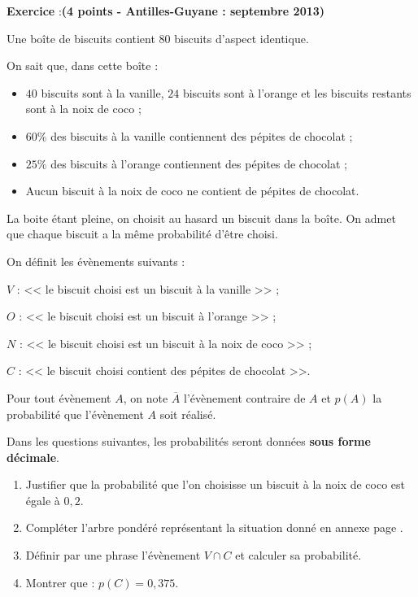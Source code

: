 \documentclass[11pt,french]{article}
\newcounter{exoc}
\newenvironment{exoc}[1]{%
  \refstepcounter{exoc}\textbf{Exercice \theexoc} :\hfill {\footnotesize\textbf{(#1)}}\par
  \medskip}%
{\medskip}
\begin{document}

\begin{exoc}{4 points - Antilles-Guyane : septembre 2013}\label{proba}
    Une boîte de biscuits contient $80$ biscuits d’aspect identique.\par
    On sait que, dans cette boîte :
        \begin{itemize}[label=\textbullet\quad]
            \item $40$ biscuits sont à la vanille, $24$ biscuits sont à l’orange et les biscuits restants sont à la noix de coco ;
            \item $60\%$ des biscuits à la vanille contiennent des pépites de chocolat ;
            \item $25\%$ des biscuits à l’orange contiennent des pépites de chocolat ;
            \item Aucun biscuit à la noix de coco ne contient de pépites de chocolat.
        \end{itemize}
    La boite étant pleine, on choisit au hasard un biscuit dans la boîte. On admet que chaque biscuit a la même probabilité d’être choisi.\par\smallskip
    On définit les évènements suivants :\par
    $V$ : << le biscuit choisi est un biscuit à la vanille >> ;\par
    $O$ : << le biscuit choisi est un biscuit à l’orange >> ;\par
    $N$ : << le biscuit choisi est un biscuit à la noix de coco >> ;\par
    $C$ : << le biscuit choisi contient des pépites de chocolat >>.\par\smallskip
    Pour tout évènement $A$, on note $\overline A$ l’évènement contraire de $A$ et $p(A)$ la probabilité que l’évènement $A$ soit réalisé.\par
    Dans les questions suivantes, les probabilités seront données \textbf{sous forme décimale}.\medskip

    \begin{enumerate}
        \item Justifier que la probabilité que l’on choisisse un biscuit à la noix de coco est égale à $0,2$.
        \item Compléter l’arbre pondéré représentant la situation donné en annexe page \pageref{Annexe}.
        \item Définir par une phrase l’évènement $V \cap C$ et calculer sa probabilité.
        \item Montrer que : $p(C)= 0,375$.
    \end{enumerate}
\end{exoc}
\end{document}
